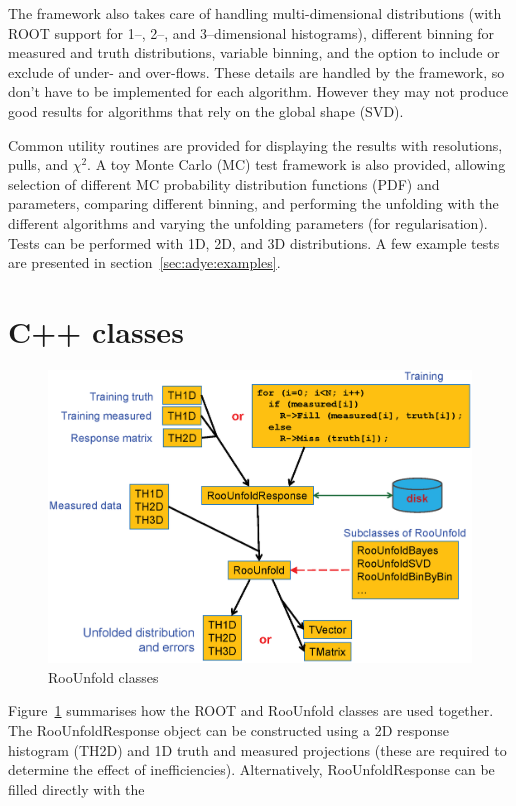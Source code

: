 \documentclass{desyproc}
\begin{document}
The framework also takes care of handling multi-dimensional distributions
(with ROOT support for 1--, 2--, and 3--dimensional histograms),
different binning for measured and truth distributions,
variable binning, and the option to include or exclude of under- and over-flows.
These details are handled by the framework, so don't have to be
implemented for each algorithm. However they may not produce good results for
algorithms that rely on the global shape (SVD).

Common utility routines are provided for displaying the results with resolutions,
pulls, and $\chi^2$. A toy Monte Carlo (MC) test framework is also provided, allowing
selection of different MC probability distribution functions (PDF) and parameters,
comparing different binning, and performing the unfolding with the different
algorithms and varying the unfolding parameters (for regularisation).
Tests can be performed with 1D, 2D, and 3D distributions.
A few example tests are presented in section~\ref{sec:adye:examples}.



\section{C++ classes}

\begin{figure}[hb]
\centerline{\includegraphics[width=\textwidth]{adye_tim.classes.eps}}
\caption{RooUnfold classes}\label{Fig:adye:classes}
\end{figure}

Figure~\ref{Fig:adye:classes} summarises how the ROOT and RooUnfold classes are used
together. The RooUnfoldResponse object can be constructed using a 2D response histogram (TH2D)
and 1D truth and measured projections (these are required to determine the effect of inefficiencies).
Alternatively, RooUnfoldResponse can be filled directly with the
\end{document}
